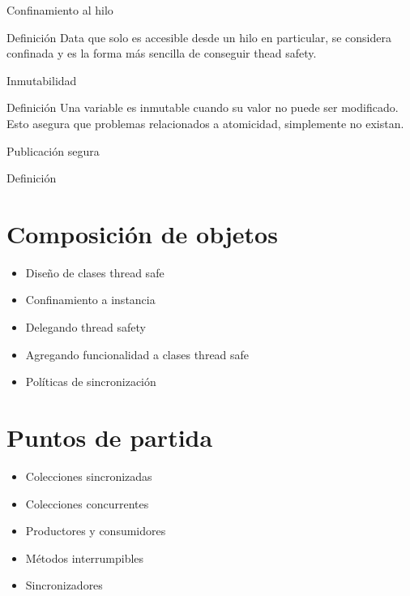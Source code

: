 \documentclass[aspectratio=169]{beamer}
\begin{document}
\begin{frame}{Confinamiento al hilo}
\begin{block}{Definición}
Data que solo es accesible desde un hilo en particular, se considera confinada
y es la forma más sencilla de conseguir thead safety.
\end{block}
\end{frame}

\begin{frame}{Inmutabilidad}
\begin{block}{Definición}
Una variable es inmutable cuando su valor no puede ser modificado. Esto
asegura que problemas relacionados a atomicidad, simplemente no existan.
\end{block}
\end{frame}

\begin{frame}{Publicación segura}
\begin{block}{Definición}
\end{block}
\end{frame}

\section{Composición de objetos} %
\begin{frame}
\begin{itemize}
\item Diseño de clases thread safe
\item Confinamiento a instancia
\item Delegando thread safety
\item Agregando funcionalidad a clases thread safe
\item Políticas de sincronización
\end{itemize}
\end{frame}

\section{Puntos de partida} %
\begin{frame}
\begin{itemize}
\item Colecciones sincronizadas
\item Colecciones concurrentes
\item Productores y consumidores
\item Métodos interrumpibles
\item Sincronizadores
\end{itemize}
\end{frame}
\end{document}
